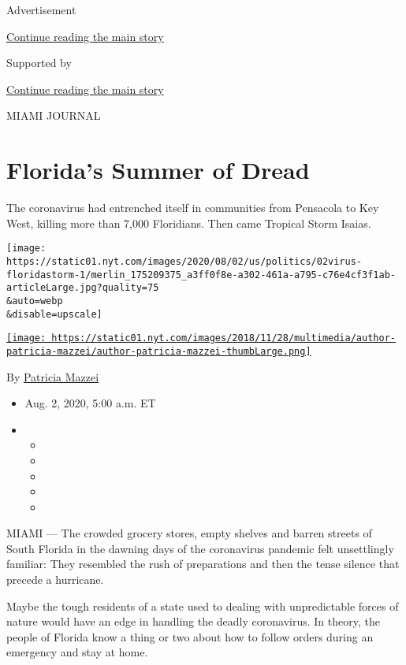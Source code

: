 Advertisement

\protect\hyperlink{after-top}{Continue reading the main story}

Supported by

\protect\hyperlink{after-sponsor}{Continue reading the main story}

MIAMI JOURNAL

\hypertarget{floridas-summer-of-dread}{%
\section{Florida's Summer of Dread}\label{floridas-summer-of-dread}}

The coronavirus had entrenched itself in communities from Pensacola to
Key West, killing more than 7,000 Floridians. Then came Tropical Storm
Isaias.

\texttt{[image: https://static01.nyt.com/images/2020/08/02/us/politics/02virus-floridastorm-1/merlin\_175209375\_a3ff0f8e-a302-461a-a795-c76e4cf3f1ab-articleLarge.jpg?quality=75\\\&auto=webp\\\&disable=upscale]}

\href{https://www.nytimes.com/by/patricia-mazzei}{\texttt{[image: https://static01.nyt.com/images/2018/11/28/multimedia/author-patricia-mazzei/author-patricia-mazzei-thumbLarge.png]}}

By \href{https://www.nytimes.com/by/patricia-mazzei}{Patricia Mazzei}

\begin{itemize}
\item
  Aug. 2, 2020, 5:00 a.m. ET
\item
  \begin{itemize}
  \item
  \item
  \item
  \item
  \item
  \end{itemize}
\end{itemize}

MIAMI --- The crowded grocery stores, empty shelves and barren streets
of South Florida in the dawning days of the coronavirus pandemic felt
unsettlingly familiar: They resembled the rush of preparations and then
the tense silence that precede a hurricane.

Maybe the tough residents of a state used to dealing with unpredictable
forces of nature would have an edge in handling the deadly coronavirus.
In theory, the people of Florida know a thing or two about how to follow
orders during an emergency and stay at home.

